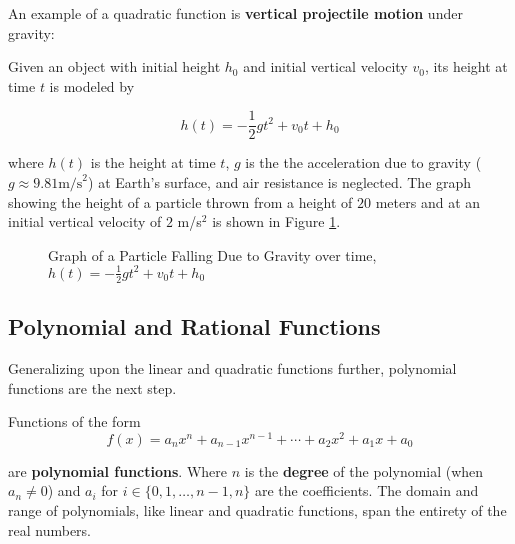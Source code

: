 \begin{example}
    An example of a quadratic function is \textbf{vertical projectile motion} under gravity:

    \noindent Given an object with initial height $h_0$ and initial vertical velocity $v_0$, its height at time $t$ is modeled by

    $$
    h(t) = -\frac{1}{2}gt^2 + v_0 t + h_0
    $$

    \noindent where $h(t)$ is the height at time $t$, $g$ is the the acceleration due to gravity ($g \approx 9.81 \text{m/s}^2$) at Earth's surface, and air resistance is neglected. The graph showing the height of a particle thrown from a height of $20$ meters and at an initial vertical velocity of $2$ m/s$^2$ is shown in Figure \ref{ballistictrajectory}.

    \begin{figure}[!ht]
        \centering
        \label{ballistictrajectory}
        \caption{Graph of a Particle Falling Due to Gravity over time, $h(t) = -\frac{1}{2}gt^2 + v_0 t + h_0$}
    \end{figure}
\end{example}

\subsection{Polynomial and Rational Functions}\label{sect:polynomial and rational function}

Generalizing upon the linear and quadratic functions further, polynomial functions are the next step.

\begin{definition}
    Functions of the form
    \begin{equation}
        f(x) = a_n x^n + a_{n-1} x^{n-1} + \cdots + a_2 x^2 + a_1 x + a_0
    \end{equation}

    \noindent are \textbf{polynomial functions}. Where $n$ is the \textbf{degree} of the polynomial (when $a_n \neq 0$) and $a_i$ for $i \in \{0,1,\dots,n-1,n\}$ are the coefficients. The domain and range of polynomials, like linear and quadratic functions, span the entirety of the real numbers.
\end{definition}

